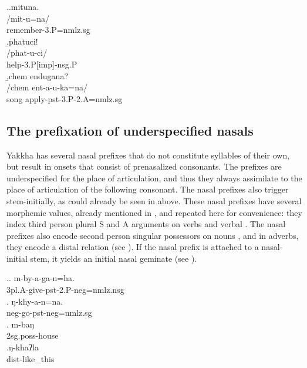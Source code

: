 			\ex.\a.\glll mituna.\\
			/mit-u=na/\\
			remember{\sc [pst]-3.P=nmlz.sg}\\
			\b.\glll  phatuci!\\
			/phat-u-ci/\\
			help{\sc -3.P[imp]-nsg.P}\\
			\b.\glll chem endugana?\\
			/chem ent-a-u-ka=na/\\
			song apply{\sc -pst-3.P-2.A=nmlz.sg}\\
	 
	 
\subsection{The prefixation of underspecified nasals}\label{nas-pref}		 
		 
Yakkha has several nasal prefixes that do not constitute  syllables of their own, but result in onsets that consist of prenasalized consonants. The prefixes are underspecified for the place of articulation, and thus they always assimilate to the place of articulation of the following consonant. The nasal prefixes also trigger  stem-initially, as could already be seen in  above. These nasal prefixes have several morphemic values, already mentioned in , and repeated here for convenience: they index third person plural S and A arguments on verbs \Next[a] and verbal  \Next[b]. The nasal prefixes also encode second person singular possessors on nouns \Next[c], and in adverbs, they encode a distal relation (see \Next[d]). If the nasal prefix is attached to a nasal-initial stem, it yields an initial nasal geminate (see \NNext).
\largerpage
 
			
\ex.\ag.	m-by-a-ga-n=ha.\\
			{\sc 3pl.A-}give{\sc -pst-2.P-neg=nmlz.nsg}\\
			\bg. ŋ-khy-a-n=na.\\
			{\sc neg-}go{\sc [3sg]-pst-neg=nmlz.sg}\\
			\bg.	m-baŋ\\
			{\sc 2sg.poss-}house\\
			\bg.ŋ-khaʔla\\
			{\sc dist-}like\_this\\
			
